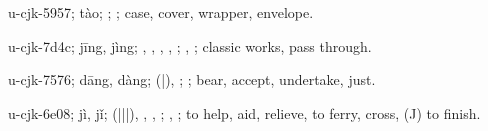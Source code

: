 \begin{multicols}{2}
{\cjkgGlue{}u-cjk-5957; tào; \cjkgGlue{}\cjkgGlue{}\cjkgGlue{}; \cjkgGlue{}; case, cover, wrapper, envelope.

\cjkgGlue{}u-cjk-7d4c; jīng, jìng; \cjkgGlue{}\cjkgGlue{}\cjkgGlue{}, \cjkgGlue{}\cjkgGlue{}\cjkgGlue{}, \cjkgGlue{}, \cjkgGlue{}\cjkgGlue{}\cjkgGlue{}, \cjkgGlue{}; \cjkgGlue{}, \cjkgGlue{}; classic works, pass through.

\cjkgGlue{}u-cjk-7576; dāng, dàng; \cjkgGlue{}\cjkgGlue{}(\cjkgGlue{}|\cjkgGlue{}), \cjkgGlue{}\cjkgGlue{}\cjkgGlue{}; \cjkgGlue{}; bear, accept, undertake, just.

\cjkgGlue{}u-cjk-6e08; jì, jǐ; \cjkgGlue{}\cjkgGlue{}(\cjkgGlue{}|\cjkgGlue{}|\cjkgGlue{}|\cjkgGlue{}), \cjkgGlue{}\cjkgGlue{}\cjkgGlue{}, \cjkgGlue{}, \cjkgGlue{}\cjkgGlue{}\cjkgGlue{}; \cjkgGlue{}, \cjkgGlue{}; to help, aid, relieve, to ferry, cross, (J) to finish.

}
\end{multicols}
